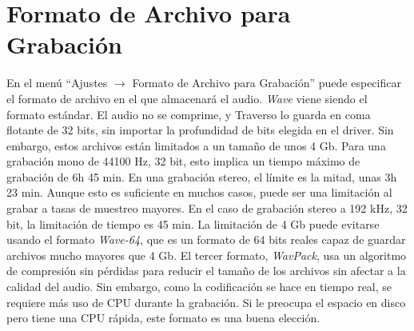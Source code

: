 \section{Formato de Archivo para Grabación}
En el menú ``Ajustes $\rightarrow$ Formato de Archivo para Grabación'' puede especificar el formato de archivo en el que almacenará el audio. \emph{Wave} viene siendo el formato estándar. El audio no se comprime, y Traverso lo guarda en coma flotante de 32 bits, sin importar la profundidad de bits elegida en el driver. Sin embargo, estos archivos están limitados a un tamaño de unos 4 Gb. Para una grabación mono de 44100 Hz, 32 bit, esto implica un tiempo máximo de grabación de 6h 45 min. En una grabación stereo, el límite es la mitad, unas 3h 23 min. Aunque esto es suficiente en muchos casos, puede ser una limitación al grabar a tasas de muestreo mayores. En el caso de grabación stereo a 192 kHz, 32 bit, la limitación de tiempo es 45 min. La limitación de 4 Gb puede evitarse usando el formato \emph{Wave-64}, que es un formato de 64 bits reales capaz de guardar archivos mucho mayores que 4 Gb. El tercer formato, \emph{WavPack}, usa un algoritmo de compresión sin pérdidas para reducir el tamaño de los archivos sin afectar a la calidad del audio. Sin embargo, como la codificación se hace en tiempo real, se requiere más uso de CPU durante la grabación. Si le preocupa el espacio en disco pero tiene una CPU rápida, este formato es una buena elección.

